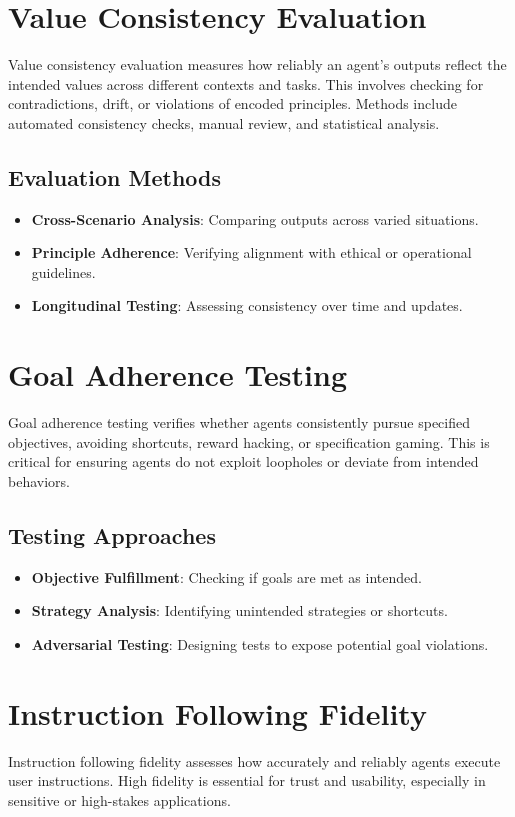\begin{TNtwocol}
\section{Value Consistency Evaluation}
Value consistency evaluation measures how reliably an agent’s outputs reflect the intended values across different contexts and tasks. This involves checking for contradictions, drift, or violations of encoded principles. Methods include automated consistency checks, manual review, and statistical analysis.

\subsection{Evaluation Methods}
\begin{itemize}
    \item \textbf{Cross-Scenario Analysis}: Comparing outputs across varied situations.
    \item \textbf{Principle Adherence}: Verifying alignment with ethical or operational guidelines.
    \item \textbf{Longitudinal Testing}: Assessing consistency over time and updates.
\end{itemize}

\section{Goal Adherence Testing}
Goal adherence testing verifies whether agents consistently pursue specified objectives, avoiding shortcuts, reward hacking, or specification gaming. This is critical for ensuring agents do not exploit loopholes or deviate from intended behaviors.

\subsection{Testing Approaches}
\begin{itemize}
    \item \textbf{Objective Fulfillment}: Checking if goals are met as intended.
    \item \textbf{Strategy Analysis}: Identifying unintended strategies or shortcuts.
    \item \textbf{Adversarial Testing}: Designing tests to expose potential goal violations.
\end{itemize}

\section{Instruction Following Fidelity}
Instruction following fidelity assesses how accurately and reliably agents execute user instructions. High fidelity is essential for trust and usability, especially in sensitive or high-stakes applications.


\end{TNtwocol}
